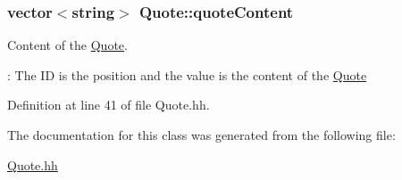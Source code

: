 \subsubsection[{\texorpdfstring{quote\+Content}{quoteContent}}]{\setlength{\rightskip}{0pt plus 5cm}vector$<$string$>$ Quote\+::quote\+Content\hspace{0.3cm}{\ttfamily [private]}}\hypertarget{class_quote_a0ffcb584920e14d7dd5c45820997f989}{}\label{class_quote_a0ffcb584920e14d7dd5c45820997f989}


Content of the \hyperlink{class_quote}{Quote}. 

\+: The ID is the position and the value is the content of the \hyperlink{class_quote}{Quote} 

Definition at line 41 of file Quote.\+hh.



The documentation for this class was generated from the following file\+:\begin{DoxyCompactItemize}
\item 
\hyperlink{_quote_8hh}{Quote.\+hh}\end{DoxyCompactItemize}
